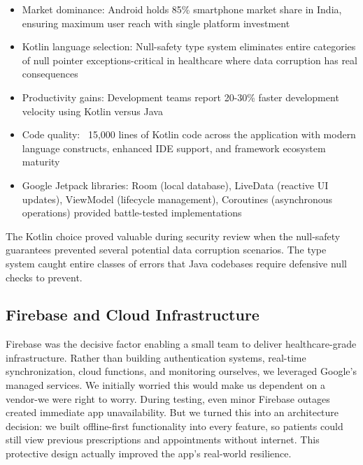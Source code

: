 \documentclass[12pt,a4paper]{report}
\begin{document}
\begin{itemize}
  \item Market dominance: Android holds 85\% smartphone market share in India, ensuring maximum user reach with single platform investment
  \item Kotlin language selection: Null-safety type system eliminates entire categories of null pointer exceptions-critical in healthcare where data corruption has real consequences
  \item Productivity gains: Development teams report 20-30\% faster development velocity using Kotlin versus Java
  \item Code quality: ~15,000 lines of Kotlin code across the application with modern language constructs, enhanced IDE support, and framework ecosystem maturity
  \item Google Jetpack libraries: Room (local database), LiveData (reactive UI updates), ViewModel (lifecycle management), Coroutines (asynchronous operations) provided battle-tested implementations
\end{itemize}

The Kotlin choice proved valuable during security review when the null-safety guarantees prevented several potential data corruption scenarios. The type system caught entire classes of errors that Java codebases require defensive null checks to prevent.

\subsection{Firebase and Cloud Infrastructure}

Firebase was the decisive factor enabling a small team to deliver healthcare-grade infrastructure. Rather than building authentication systems, real-time synchronization, cloud functions, and monitoring ourselves, we leveraged Google's managed services. We initially worried this would make us dependent on a vendor-we were right to worry. During testing, even minor Firebase outages created immediate app unavailability. But we turned this into an architecture decision: we built offline-first functionality into every feature, so patients could still view previous prescriptions and appointments without internet. This protective design actually improved the app's real-world resilience.
\end{document}

